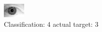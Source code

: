 \begin{figure}[h!]
\begin{center}
\includegraphics[width=0.60\columnwidth]{figures/ID2061_class_4_target_3.png}
\end{center}
\caption{ Classification: 4 actual target: 3}
\label{fig:ID2061_class_4_target_3}
\end{figure}

